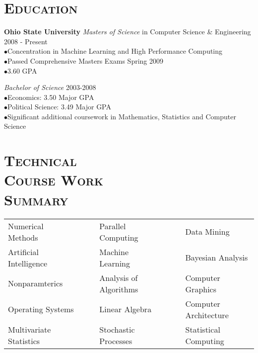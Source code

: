 \begin{resume}

\section{\textsc{Education}}

\textbf{Ohio State University}
\newline
\textit{Masters of Science} in Computer Science \& Engineering \hfill 2008 - Present \\
$\bullet$Concentration in Machine Learning and High Performance Computing\\
$\bullet$Passed Comprehensive Masters Exams Spring 2009 \\
$\bullet$3.60 GPA

\textit{Bachelor of Science} \hfill 2003-2008 \\
$\bullet$Economics: 3.50 Major GPA \\
$\bullet$Political Science: 3.49 Major GPA  \\
$\bullet$Significant additional coursework in Mathematics, Statistics and Computer Science
         
\section{\textsc{Technical \\  Course Work \\ Summary}}


\begin{tabular}{lllll}
Numerical Methods      & \ \ & Parallel Computing      & \ \ & Data Mining  \\
Artificial Intelligence   & \ \ & Machine Learning    & \ \ & Bayesian Analysis \\ 
Nonparamterics     & \ \ & Analysis of Algorithms          & \ \ &  Computer Graphics    \\
Operating Systems      & \ \ & Linear Algebra           & \ \ & Computer Architecture \\
Multivariate Statistics      & \ \ & Stochastic Processes           & \ \ & Statistical Computing  \\
\end{tabular}

\begin{formatb}
  \\
  \body\\
\end{formatb}


\end{resume}
